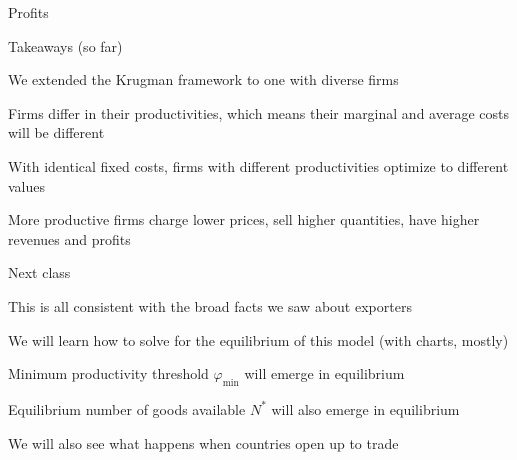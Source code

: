 \documentclass[notes,11pt, aspectratio=169, xcolor=table]{beamer}
\newenvironment{wideitemize}{\itemize\addtolength{\itemsep}{10pt}}{\enditemize}
\begin{document}
\begin{frame}{Profits}

 \end{frame}

\begin{frame}{Takeaways (so far)}

    \begin{wideitemize}
        \item We extended the Krugman framework to one with diverse firms
        \item Firms differ in their productivities, which means their marginal and average costs will be different
        \item With identical fixed costs, firms with different productivities optimize to different values
        \item More productive firms charge lower prices, sell higher quantities, have higher revenues and profits
    \end{wideitemize}
    
\end{frame}

\begin{frame}{Next class}
    \begin{wideitemize}
    \item This is all consistent with the broad facts we saw about exporters
    \item We will learn how to solve for the equilibrium of this model (with charts, mostly)
    \item Minimum productivity threshold $\varphi_{\min}$ will emerge in equilibrium
    \item Equilibrium number of goods available $N^*$ will also emerge in equilibrium
    \item We will also see what happens when countries open up to trade
    \end{wideitemize}
\end{frame}
\end{document}
